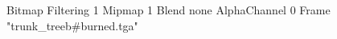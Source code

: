 {Bitmap
	{Filtering 1}
	{Mipmap 1}
	{Blend none}
	{AlphaChannel 0}
	{Frame "trunk_treeb#burned.tga"}
}
